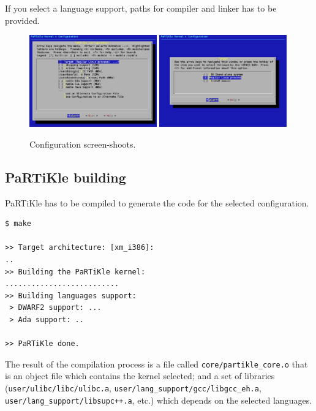 \documentclass[a4paper,10pt,twoside]{report}
\newcommand{\partikle}[0]{PaRTiKle}
\begin{document}
If you select a language support, paths for compiler and linker has
to be provided.
\begin{figure}[htbp]\centering
\includegraphics[width=0.49\textwidth]{img/config1}
\includegraphics[width=0.49\textwidth]{img/config2}
\caption{Configuration screen-shoots.}
\label{img:config1}
\end{figure}

\subsection{PaRTiKle building}



\partikle{} has to be compiled to generate the code for the selected configuration.
\begin{verbatim} 
$ make

>> Target architecture: [xm_i386]:
..
>> Building the PaRTiKle kernel:
..........................
>> Building languages support:
 > DWARF2 support: ...
 > Ada support: ..

>> PaRTiKle done.
\end{verbatim}

The result of the compilation process is a file called
\texttt{core/partikle\_core.o} that is an object file which contains
the kernel selected; and a set of libraries
(\texttt{user/ulibc/libc/ulibc.a},
\texttt{user/lang\_support/gcc/libgcc\_eh.a},
\texttt{user/lang\_support/libsupc++.a}, etc.) which depends on the
selected languages.
\end{document}
